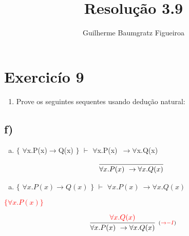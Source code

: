 \documentclass[aspectratio=43]{beamer}
\title[\sc{Resolu\c c\~ao}]{Resolu\c c\~ao 3.9}
\author[Guilherme Baumgratz Figueiroa]{Guilherme Baumgratz Figueiroa}
\institute[UFOP]{Universidade Federal de Ouro Preto} %
\date{}
\newcommand{\ria}{$\rightarrow$}
\newcommand{\fall}{$\forall$}
\begin{document}
	
	\begin{frame}
		\titlepage
	\end{frame}
	
	\section{Exercic\'io 9}
	
	\begin{frame}%
    
    	\begin{enumerate}[1.]
			\item Prove os seguintes sequentes usando dedu\c c\~ao natural: \\
		\end{enumerate}
				
	\end{frame}
    \subsection{f)}
    
    \begin{frame}[fragile]
    
    	\begin{enumerate}[f)]
			\item $\{$ \fall x.P(x)\ria Q(x) $\}$ $\vdash$ \fall x.P(x)\ \ria \fall x.Q(x) \\
		\end{enumerate}
        
        \vspace{65pt}
        
        \[
        \begin{array}{c}
		
        	\infer[_{}]
            	{\forall x.P(x)\ \to \forall x.Q(x)}
            	{}
        
		\end{array}
        \]
        
	\end{frame}
    
    \begin{frame}[fragile]
    
    	\begin{enumerate}[f)]
			\item $\{$ $\forall x.P(x)\to Q(x) $ $\}$ $\vdash$ $ \forall x.P(x)\ \to \forall x.Q(x) $ \\
		\end{enumerate}
        \textcolor{red}{ $\{\forall x.P(x)\}$}
        \vspace{60pt}
        
        \[
        \begin{array}{c}
		
        	\infer[_{(\textcolor{red}{\to -I})}]
            	{\forall x.P(x)\ \to \forall x.Q(x)}
            	{\textcolor{red}{\forall x.Q(x)}}
        
		\end{array}
        \]
        
	\end{frame}
    
\end{document}
